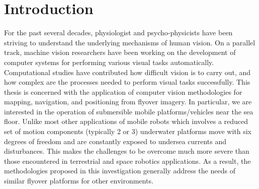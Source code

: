 \chapter{Introduction}


For the past several decades, physiologist and psycho-physicists have been striving to understand
the underlying mechanisms of human vision. On a parallel track, machine vision researchers have
been working on the development of computer systems for performing various visual tasks
automatically. Computational studies have contributed how difficult vision is to carry out, and how
complex are the processes needed to perform visual tasks successfully. This thesis is concerned
with the application of computer vision methodologies for mapping, navigation, and positioning from
flyover imagery. In particular, we are interested in the operation of submersible mobile
platforms/vehicles near the sea floor. Unlike most other applications of mobile robots which
involves a reduced set of motion components (typically 2 or 3) underwater platforms move with six
degrees of freedom and are constantly exposed to undersea currents and disturbances. This makes the
challenges to be overcome much more severe than those encountered in terrestrial and space robotics
applications. As a result, the methodologies proposed in this investigation generally address the
needs of similar flyover platforms for other environments.



